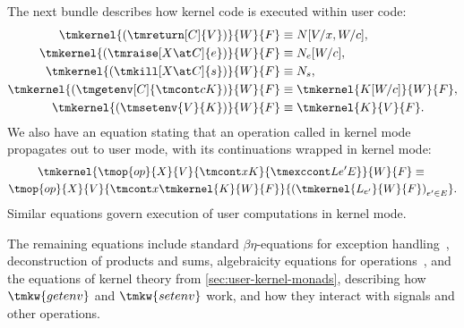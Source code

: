 The next bundle describes how kernel code is executed within user code:
%
\begin{align*}
  \tmkernel{(\tmreturn[C]{V})}{W}{F} &\equiv N[V/x, W/c], \\
  \tmkernel{(\tmraise[X \at C]{e})}{W}{F} &\equiv N_{e}[W/c], \\
  \tmkernel{(\tmkill[X \at C]{s})}{W}{F} &\equiv N_{s}, \\
  \tmkernel{(\tmgetenv[C]{\tmcont c K})}{W}{F} &\equiv \tmkernel{K[W/c]}{W}{F}, \\
  \tmkernel{(\tmsetenv{V}{K})}{W}{F} &\equiv \tmkernel{K}{V}{F}.
\end{align*}
%
We also have an equation stating that an operation called in kernel mode propagates out to
user mode, with its continuations wrapped in kernel mode:
%
\begin{multline*}
  \tmkernel{\tmop{op}{X}{V}{\tmcont x K}{\tmexccont L {e'} E}}{W}{F}
  \equiv {} \\
  \tmop{op}{X}{V}{\tmcont x {\tmkernel{K}{W}{F}}}{
    \left(
      \tmkernel{L_{e'}}{W}{F}
    \right)_{e' \in E}}.
\end{multline*}
%
Similar equations govern execution of user computations in kernel mode.

The remaining equations include standard $\beta\eta$-equations for
exception handling~\cite{Benton:ExceptionalSyntax}, deconstruction of products and sums,
algebraicity equations for operations~\cite{Pretnar:Thesis}, and the equations of kernel theory from \cref{sec:user-kernel-monads}, describing how $\tmkw{getenv}$ and $\tmkw{setenv}$ work, and how they interact with signals and other operations.

